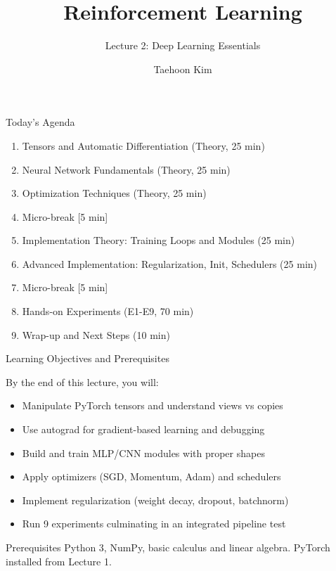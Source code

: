 \documentclass[aspectratio=169,10pt]{beamer}
\title{Reinforcement Learning}
\subtitle{Lecture 2: Deep Learning Essentials}
\author{Taehoon Kim}
\institute{Sogang University MIMIC Lab \\ \url{https://mimic-lab.com}}
\begin{document}
\frame{\titlepage}

\begin{frame}{Today's Agenda}
\begin{enumerate}
    \item Tensors and Automatic Differentiation (Theory, 25 min)
    \item Neural Network Fundamentals (Theory, 25 min)
    \item Optimization Techniques (Theory, 25 min)
    \item Micro-break [5 min]
    \item Implementation Theory: Training Loops and Modules (25 min)
    \item Advanced Implementation: Regularization, Init, Schedulers (25 min)
    \item Micro-break [5 min]
    \item Hands-on Experiments (E1-E9, 70 min)
    \item Wrap-up and Next Steps (10 min)
\end{enumerate}
\end{frame}

\begin{frame}{Learning Objectives and Prerequisites}
\begin{block}{By the end of this lecture, you will:}
\begin{itemize}
    \item Manipulate PyTorch tensors and understand views vs copies
    \item Use autograd for gradient-based learning and debugging
    \item Build and train MLP/CNN modules with proper shapes
    \item Apply optimizers (SGD, Momentum, Adam) and schedulers
    \item Implement regularization (weight decay, dropout, batchnorm)
    \item Run 9 experiments culminating in an integrated pipeline test
\end{itemize}
\end{block}

\begin{alertblock}{Prerequisites}
Python 3, NumPy, basic calculus and linear algebra. PyTorch installed from Lecture 1.
\end{alertblock}
\end{frame}

\end{document}
